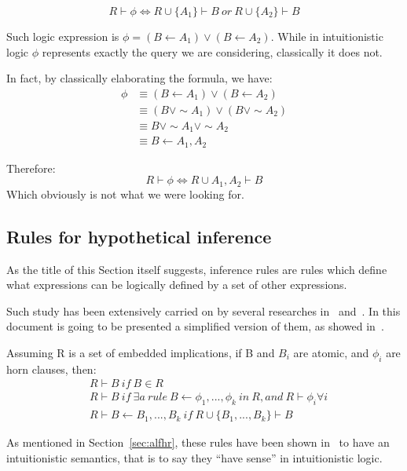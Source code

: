 \begin{equation}
  R \vdash \phi \iff R \cup \{A_1\} \vdash B\ or\ R \cup \{A_2\} \vdash B
\end{equation}

Such logic expression is $\phi = (B \leftarrow A_1) \lor (B \leftarrow A_2)$.
While in intuitionistic logic $\phi$ represents exactly the query
we are considering, classically it does not.

In fact, by classically elaborating the formula, we have:
\begin{equation}
  \begin{split}
  \phi &\equiv (B \leftarrow A_1) \lor (B \leftarrow A_2)\\
  &\equiv (B \lor \sim A_1) \lor (B \lor \sim A_2)\\
  &\equiv B \lor \sim A_1 \lor \sim A_2 \\
  &\equiv B \leftarrow A_1, A_2
  \end{split}
\end{equation}

Therefore:
\begin{equation}
  R \vdash \phi \iff R \cup {A_1, A_2} \vdash B
\end{equation}
Which obviously is not what we were looking for.

\subsection{Rules for hypothetical inference}
\label{sec:rfhi}
As the title of this Section itself suggests, inference rules are rules
which define what expressions can be logically defined by a set of other expressions.

Such study has been extensively carried on by several researches
in~\cite{Gabbay1984319}\cite{Miller:1989:LAM:65822.65826} and~\cite{McCarty:1988:CIL:49484.49485}.
In this document is going to be presented a simplified
version of them, as showed in~\cite{Bonner88alogic}.

Assuming R is a set of embedded implications, if B and $B_i$ are atomic, and $\phi_i$
are horn clauses, then:
\begin{equation}
  \begin{split}
    &R \vdash B\ if\ B \in R \\
    &R \vdash B\ if\ \exists a\ rule\ B \leftarrow \phi_1,...,\phi_k\ in\ R, and\ R \vdash \phi_i \forall i\\
    &R \vdash B \leftarrow B_1,..., B_k\ if\ R \cup \{B_1,...,B_k\} \vdash B
  \end{split}
\end{equation}


As mentioned in Section~\ref{sec:alfhr}, these rules have been shown in~\cite{Bonner88alogic}
to have an intuitionistic semantics, that is to say they ``have sense'' in intuitionistic logic.
